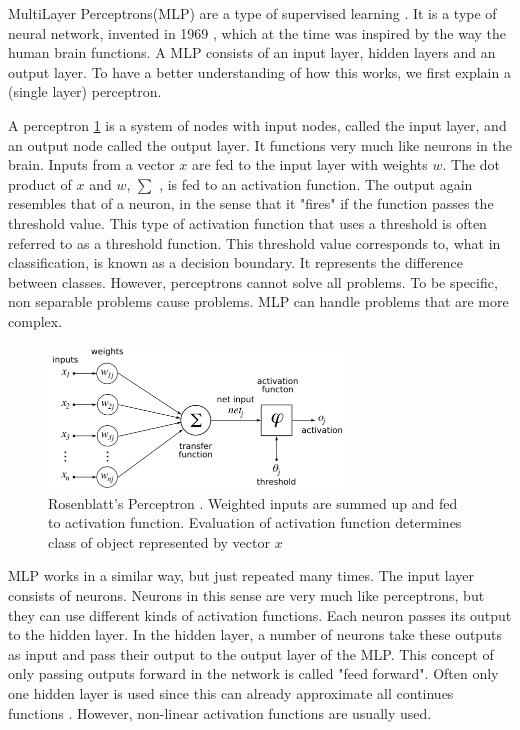 MultiLayer Perceptrons(MLP) are a type of supervised learning \cite{michie1994machine}. It is a type of neural network, invented in 1969 \cite{minsky1969perceptions}, which at the time  was inspired by the way the human brain functions. A MLP consists of an input layer, hidden layers and an output layer. To have a better understanding of how this works, we first explain a (single layer) perceptron\cite{rosenblatt1958perceptron}. 

A perceptron \ref{fig:perceptron} is a system of nodes with input nodes, called the input layer, and an output node called the output layer. It functions very much like neurons in the brain. Inputs from a vector $x$ are fed to the input layer with weights $w$. The dot product of $x$ and $w$, $\sum$ ,  is fed to an activation function. The output again resembles that of a neuron, in the sense that it "fires" if the function passes the threshold value. This type of activation function that uses a threshold is often referred to as a threshold function. This threshold value corresponds to, what in classification, is known as a decision boundary. It represents the difference between classes. However, perceptrons cannot solve all problems. To be specific, non separable problems cause problems. MLP can handle problems that are more complex. \\
\begin{figure}[H]
    \includegraphics[width=80mm]{./img/perceptron.png}
    \caption{\footnotesize{Rosenblatt's Perceptron \cite{wikiPerceptronPNG}. Weighted inputs are summed up and fed to activation function. Evaluation of activation function determines class of object represented by vector $x$}}
    \label{fig:perceptron}
\end{figure}

MLP works in a similar way, but just repeated many times. The input layer consists of neurons. Neurons in this sense are very much like perceptrons, but they can use different kinds of activation functions. Each neuron passes its output to the hidden layer. In the hidden layer, a number of neurons take these outputs as input and pass their output to the output layer of the MLP. This concept of only passing outputs forward in the network is called "feed forward". Often only one hidden layer is used since this can already approximate all continues functions \cite{cybenko1989approximation}. However, non-linear activation functions are usually used. 

